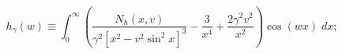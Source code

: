 \begin{equation} 
\label{hsD} 
h_{\gamma}(w)\equiv   %
\int _{0}^{\infty}\left(\frac{N_h(x,v)} 
{\gamma ^2[x^2-v^2\sin ^2 x]^3} 
-\frac{3}{x^4}+\frac{2\gamma ^2 v^2}{x^2}\right)\cos (wx)\; d x; 
\end{equation} 
